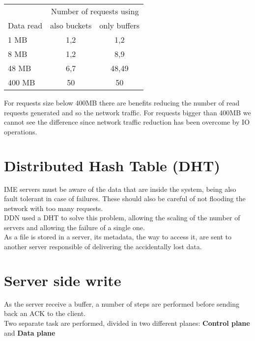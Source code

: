 \vspace{0.5cm}
\begin{tabular}{l | c | c}
    & \multicolumn{2}{|c}{Number of requests using} \\
    Data read & also buckets & only buffers \\ \hline
    1 MB & 1,2 & 1,2 \\
    8 MB & 1,2 & 8,9 \\
    48 MB& 6,7 & 48,49 \\
    400 MB & 50 & 50 \\
\end{tabular}
\vspace{0.5cm}

For requests size below 400MB there are benefits reducing the number of read
requests generated and so the network traffic. For requests bigger than 400MB
we cannot see the difference since network traffic reduction has been overcome
by IO operations.



\section{Distributed Hash Table (DHT)}
IME servers must be aware of the data that are inside the system, being also
fault tolerant in case of failures. These should also be careful of not flooding
the network with too many requests. \\
DDN used a DHT to solve this problem, allowing the scaling of the number of
servers and allowing the failure of a single one. \\
As a file is stored in a server, its metadata, the way to access it, are sent to
another server responsible of delivering the accidentally lost data.

\section{Server side write}
As the server receive a buffer, a number of steps are performed before sending
back an ACK to the client. \\ Two separate task are performed, divided in two
different planes: \textbf{Control plane} and \textbf{Data plane}

